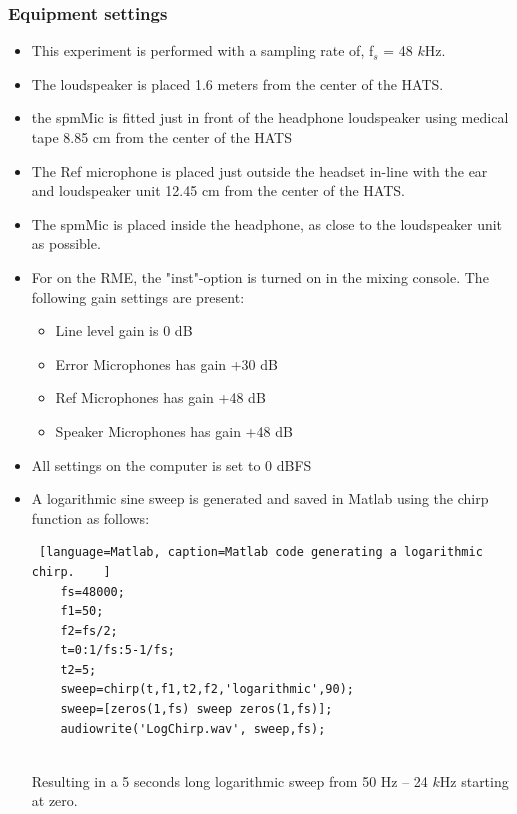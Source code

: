 \subsubsection{Equipment settings}\label{sec:SettingsAngInc}
\begin{itemize}
	\item This experiment is performed with a sampling rate of, f$_{s}$ = 48 $k$Hz.
	\item The loudspeaker is placed 1.6 meters from the center of the HATS.
	\item the spmMic is fitted just in front of the headphone loudspeaker using medical tape 8.85 cm from the center of the HATS
	\item The Ref microphone is placed just outside the headset in-line with the ear and loudspeaker unit 12.45 cm from the center of the HATS. 
	\item The spmMic is placed inside the headphone, as close to the loudspeaker unit as possible. 
	\item For on the RME, the "inst"-option is turned on in the mixing console. The following gain settings are present: 		
	\begin{itemize}
		\item Line level gain is 0 dB
		\item Error Microphones has gain +30 dB
		\item Ref Microphones has gain +48 dB
		\item Speaker Microphones has gain +48 dB
	\end{itemize}
	\item All settings on the computer is set to 0 dBFS
	\item A logarithmic sine sweep is generated and saved in Matlab using the chirp function as follows:
	\begin{lstlisting} [language=Matlab, caption=Matlab code generating a logarithmic chirp.	]
	fs=48000;
	f1=50;
	f2=fs/2;
	t=0:1/fs:5-1/fs;
	t2=5;
	sweep=chirp(t,f1,t2,f2,'logarithmic',90);
	sweep=[zeros(1,fs) sweep zeros(1,fs)];
	audiowrite('LogChirp.wav', sweep,fs);
	
	\end{lstlisting}
	Resulting in a 5 seconds long logarithmic sweep from 50 Hz -- 24 $k$Hz starting at zero.
\end{itemize} 
 
